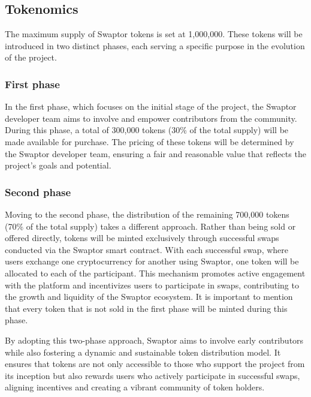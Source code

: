 \documentclass[12pt]{article}
\begin{document}
\newpage

\subsection{Tokenomics}
The maximum supply of Swaptor tokens is set at 1,000,000. These tokens will be introduced in two distinct phases,
each serving a specific purpose in the evolution of the project.

\subsubsection{First phase}
In the first phase, which focuses on the initial stage of the project, the Swaptor developer team aims to involve
and empower contributors from the community. During this phase, a total of 300,000 tokens
(30\% of the total supply) will be made available for purchase.
The pricing of these tokens will be determined by the Swaptor developer team, ensuring a fair and reasonable value
that reflects the project's goals and potential.

\subsubsection{Second phase}
Moving to the second phase, the distribution of the remaining 700,000 tokens
(70\% of the total supply) takes a different approach. Rather than being sold or offered directly,
tokens will be minted exclusively through successful swaps conducted via the Swaptor smart contract.
With each successful swap, where users exchange one cryptocurrency for another using Swaptor,
one token will be allocated to each of the participant. This mechanism promotes active engagement with the platform
and incentivizes users to participate in swaps, contributing to the growth and liquidity of the Swaptor ecosystem.
It is important to mention that every token that is not sold in the first phase will be minted during this phase.

\vspace{1.5cc}
By adopting this two-phase approach, Swaptor aims to involve early contributors while also fostering
a dynamic and sustainable token distribution model. It ensures that tokens are not only accessible to
those who support the project from its inception but also rewards users who actively participate in successful swaps,
aligning incentives and creating a vibrant community of token holders.

\vspace{2cc}
\end{document}
